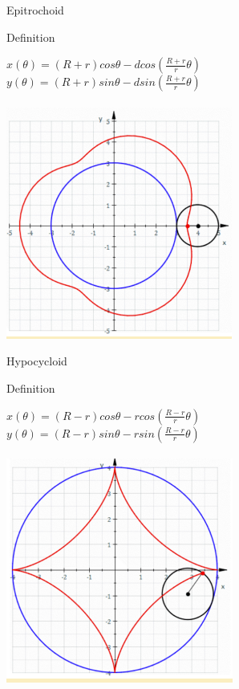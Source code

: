 \begin{frame}{Epitrochoid}
    \begin{block}{Definition}
        \begin{center}
            $x(\theta)=(R+r)cos\theta-d cos(\frac{R+r}{r}\theta)$\\
            $y(\theta)=(R+r)sin\theta-d sin(\frac{R+r}{r}\theta)$\\~\\
            \includegraphics[width=0.55\linewidth]{res/Epitrochoid.png}
        \end{center}
    \end{block}
\end{frame}
\begin{frame}{Hypocycloid}
    \begin{block}{Definition}
        \begin{center}
            $x(\theta)=(R-r)cos\theta-r cos(\frac{R-r}{r}\theta)$\\
            $y(\theta)=(R-r)sin\theta-r sin(\frac{R-r}{r}\theta)$\\~\\
            \includegraphics[width=0.55\linewidth]{res/Hypocycloid.png}
        \end{center}
    \end{block}
\end{frame}
